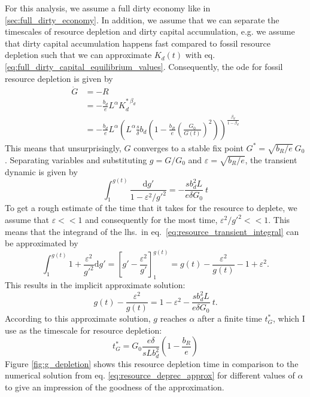 For this analysis, we assume a full dirty economy like in \ref{sec:full_dirty_economy}. In addition, we assume that we can separate the timescales of resource depletion and dirty capital accumulation, e.g. we assume that dirty capital accumulation happens fast compared to fossil resource depletion such that we can approximate $K_d(t)$ with eq. \ref{eq:full_dirty_capital_equilibrium_values}. Consequently, the ode for fossil resource depletion is given by
\begin{align}
	\dot{G} &= -R \nonumber \\
        &= -\frac{b_d}{e}L^{\alpha}K_d^{*\ \beta_d} \nonumber \\
	&= - \frac{b_d}{e}L^{\alpha}\left(L^{\alpha} \frac{s}{\delta}b_d\left( 1-\frac{b_R}{e}\left( \frac{G_0}{G(t)} \right)^2 \right) \right)^{\frac{\beta_d}{1-\beta_d}}
	\label{eq:resource_deprec_approx}
\end{align}
This means that unsurprisingly, $G$ converges to a stable fix point $G^* = \sqrt{b_R/e}\ G_0$. Separating variables and substituting $g = G/G_0$ and $\varepsilon = \sqrt{b_R/e}$, the transient dynamic is given by
\begin{equation}
	\int_1^{g(t)} \frac{{\mathrm d} g'}{1 - \varepsilon^2/g'^2} = - \frac{s b_d^2 L}{e \delta G_0} \ t
	\label{eq:resource_transient_integral}
\end{equation}
To get a rough estimate of the time that it takes for the resource to deplete, we assume that $\varepsilon << 1$ and consequently for the most time, $\varepsilon^2/g'^2 << 1$.
This means that the integrand of the lhs.\ in eq.~\eqref{eq:resource_transient_integral} can be approximated by
\begin{equation}
	\int_1^{g(t)}1+\frac{\varepsilon^2}{g'^2} {\mathrm d}g' = \left[ g' - \frac{\varepsilon^2}{g'} \right]_1^{g(t)} = g(t) - \frac{\varepsilon^2}{g(t)} -1+\varepsilon^2.
	\label{eq:resource_transient_solution}
\end{equation}
This results in the implicit approximate solution:
\begin{equation}
  g(t) - \frac{\varepsilon^2}{g(t)} = 1 -\varepsilon^2 - \frac{s b_d^2 L}{e \delta G_0} \ t.
	\label{eq:resource_transient_solution2}
\end{equation}
According to this approximate solution, $g$ reaches $\alpha$ after a finite time $t^*_G$, which I use as the timescale for resource depletion:
\begin{equation}
	t^*_G = G_0\frac{e \delta}{s L b_d^2}\left( 1-\frac{b_R}{e} \right)
	\label{eq:resource_depletion_time}
\end{equation}
Figure \ref{fig:g_depletion} shows this resource depletion time in comparison to the numerical solution from eq. \ref{eq:resource_deprec_approx} for different values of $\alpha$ to give an impression of the goodness of the approximation.

